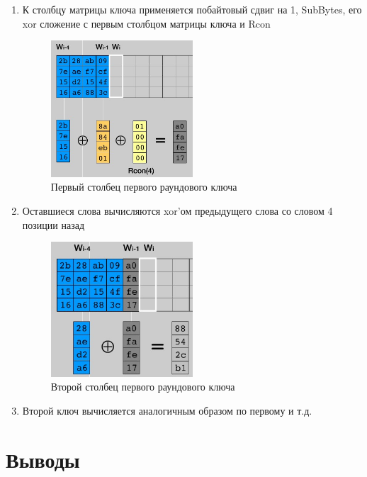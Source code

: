 \documentclass[a4paper, 14pt]{extarticle}
\begin{document}
\begin{enumerate}
    \item К столбцу матрицы ключа применяется побайтовый сдвиг на 1, SubBytes, его xor сложение с первым столбцом матрицы ключа и Rcon
    \begin{figure}[h]
        \centering
        \includegraphics[width=0.5\textwidth]{img/S011.jpg}
        \caption{Первый столбец первого раундового ключа}
    \end{figure}
    \item Оставшиеся слова вычисляются xor'ом предыдущего слова со словом 4 позиции назад
    \begin{figure}[h]
        \centering
        \includegraphics[width=0.5\textwidth]{img/S012.jpg}
        \caption{Второй столбец первого раундового ключа}
    \end{figure}
    \FloatBarrier{}
    \item Второй ключ вычисляется аналогичным образом по первому и т.д.
\end{enumerate}

\section*{Выводы}
\end{document}
